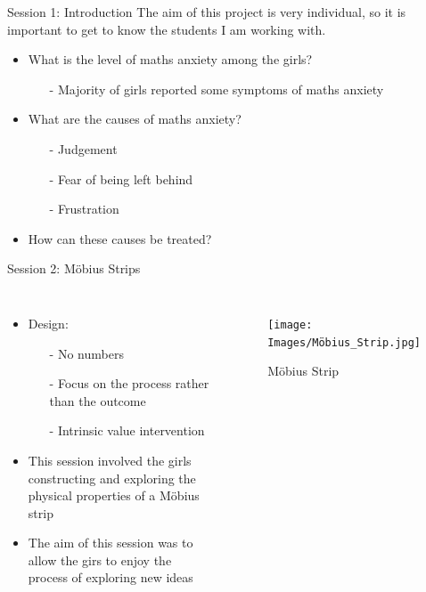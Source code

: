 \documentclass{beamer}  %
\begin{document}
\begin{frame}{Session 1: Introduction}
    The aim of this project is very individual, so it is important to get to know the students I am working with.
    \begin{itemize}
        \item What is the level of maths anxiety among the girls?
        \begin{itemize}
            \item[-]Majority of girls reported some symptoms of maths anxiety
        \end{itemize}
        \item What are the causes  of maths anxiety?
        \begin{itemize}
            \item[-] Judgement
            \item[-] Fear of being left behind
            \item[-] Frustration
        \end{itemize}
        \item How can these causes be treated?
    \end{itemize}
\end{frame}

\begin{frame}{Session 2: M\"{o}bius Strips}

    \begin{columns}
        \begin{itemize}
            \item Design:
            \begin{itemize}
                \item[-] No numbers
                \item[-] Focus on the process rather than the outcome
                \item[-] Intrinsic value intervention
            \end{itemize} 
            \item This session involved the girls constructing and exploring the physical properties of a M\"{o}bius strip
            \item The aim of this session was to allow the girs to enjoy the process of exploring new ideas 
            
        \end{itemize}
        \begin{figure}
            \texttt{[image: Images/Möbius\_Strip.jpg]}
            \caption{M\"{o}bius Strip}
        \end{figure}
    \end{columns}
\end{frame}
\end{document}
